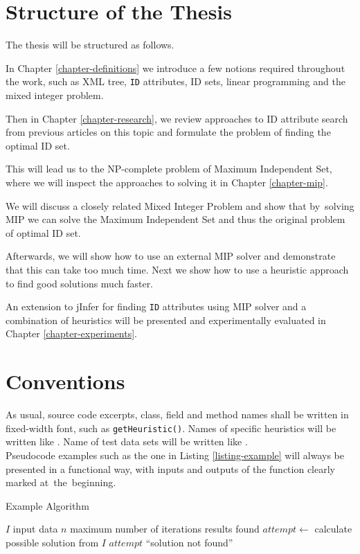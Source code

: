 \section*{Structure of the Thesis}

The thesis will be structured as follows.

In Chapter \ref{chapter-definitions} we introduce a few notions required throughout the work, such as XML tree, \texttt{ID} attributes, ID sets, linear programming and the mixed integer problem.

Then in Chapter \ref{chapter-research}, we review approaches to ID attribute search from previous articles on this topic and formulate the problem of finding the optimal ID set.

This will lead us to the NP-complete problem of Maximum Independent Set, where we will inspect the approaches to solving it in Chapter \ref{chapter-mip}.

We will discuss a closely related Mixed Integer Problem and show that by~solving MIP we can solve the Maximum Independent Set and thus the original problem of optimal ID set.

Afterwards, we will show how to use an external MIP solver and demonstrate that this can take too much time. Next we show how to use a heuristic approach to find good solutions much faster.

An extension to jInfer for finding \texttt{ID} attributes using MIP solver and a combination of heuristics will be presented and experimentally evaluated in Chapter \ref{chapter-experiments}.

\section*{Conventions}

As usual, source code excerpts, class, field and method names shall be written in fixed-width font, such as \texttt{get\-Heu\-ris\-tic()}. Names of specific heuristics will be written like . Name of test data sets will be written like .\\

Pseudocode examples such as the one in Listing \ref{listing-example} will always be presented in a functional way, with inputs and outputs of the function clearly marked at~the~beginning.

\begin{algorithm}
\caption{Example Algorithm}
\label{listing-example}
\begin{algorithmic}
\REQUIRE $I$ input data
\REQUIRE $n$ maximum number of iterations
\ENSURE results found
  \STATE {}
  \STATE $attempt \gets $ calculate possible solution from $I$
    \RETURN $attempt$
  \ENDIF
  \RETURN ``solution not found''
\ENDFOR
\end{algorithmic}
\end{algorithm}


